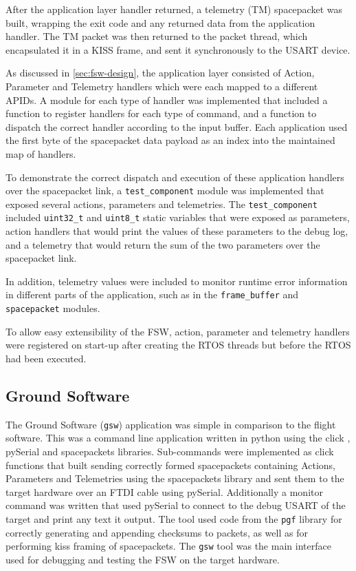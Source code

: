 \documentclass[../report.tex]{subfiles}
\begin{document}
After the application layer handler returned, a telemetry (TM) spacepacket was
built, wrapping the exit code and any returned data from the application
handler. The TM packet was then returned to the packet thread, which
encapsulated it in a KISS frame, and sent it synchronously to the USART device.

As discussed in \autoref{sec:fsw-design}, the application layer consisted of
Action, Parameter and Telemetry handlers which were each mapped to a different
APIDs. A module for each type of handler was implemented that included a
function to register handlers for each type of command, and a function to
dispatch the correct handler according to the input buffer. Each application
used the first byte of the spacepacket data payload as an index into the
maintained map of handlers.

To demonstrate the correct dispatch and execution of these application handlers
over the spacepacket link, a \lstinline|test_component| module was implemented
that exposed several actions, parameters and telemetries. The
\lstinline|test_component| included \lstinline|uint32_t| and
\lstinline|uint8_t| static variables that were exposed as parameters, action
handlers that would print the values of these parameters to the debug log, and
a telemetry that would return the sum of the two parameters over the
spacepacket link.

In addition, telemetry values were included to monitor runtime error
information in different parts of the application, such as in the
\lstinline|frame_buffer| and \lstinline|spacepacket| modules.

To allow easy extensibility of the FSW, action, parameter and telemetry
handlers were registered on start-up after creating the RTOS threads but before
the RTOS had been executed.

\subsection{Ground Software}

The Ground Software (\lstinline|gsw|) application was simple in comparison to
the flight software. This was a command line application written in python
using the click \citep{click}, pySerial \citep{pyserial} and spacepackets
\citep{spacepackets} libraries. Sub-commands were implemented as click
functions that built sending correctly formed spacepackets containing Actions,
Parameters and Telemetries using the spacepackets library and sent them to the
target hardware over an FTDI cable using pySerial. Additionally a monitor
command was written that used pySerial to connect to the debug USART of the
target and print any text it output. The tool used code from  the
\lstinline|pgf| library for correctly generating and appending checksums to
packets, as well as for performing kiss framing of spacepackets. The
\lstinline|gsw| tool was the main interface used for debugging and testing the
FSW on the target hardware.
\end{document}
